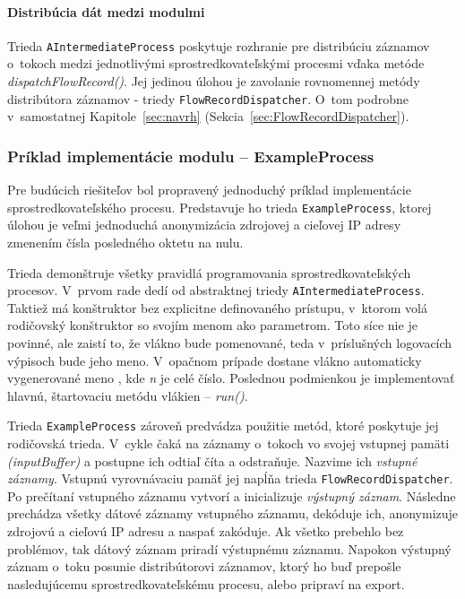 \paragraph{Distribúcia dát medzi modulmi} 
Trieda \verb|AIntermediateProcess| poskytuje rozhranie pre distribúciu záznamov o~tokoch medzi 
jednotlivými sprostredkovateľskými procesmi vďaka metóde \emph{dispatchFlowRecord()}. 
Jej jedinou úlohou je zavolanie rovnomennej metódy distribútora záznamov - triedy \verb|FlowRecordDispatcher|.
O~tom podrobne v~samostatnej Kapitole~\ref{sec:navrh} (Sekcia~\ref{sec:FlowRecordDispatcher}).



\subsubsection{Príklad implementácie modulu -- ExampleProcess}

Pre budúcich riešiteľov bol propravený jednoduchý príklad implementácie sprostredkovateľského procesu.
Predstavuje ho trieda \verb|ExampleProcess|, ktorej úlohou je veľmi jednoduchá anonymizácia zdrojovej a 
cieľovej IP adresy zmenením čísla posledného oktetu na nulu. 

Trieda demonštruje všetky pravidlá programovania sprostredkovateľských procesov. V~prvom rade dedí od 
abstraktnej triedy \verb|AIntermediateProcess|. Taktiež má konštruktor bez explicitne definovaného 
prístupu, v~ktorom volá rodičovský konštruktor so svojím menom ako parametrom. Toto síce nie je povinné,
ale zaistí to, že vlákno bude pomenované, teda v~príslušných logovacích výpisoch bude jeho meno.
V~opačnom prípade dostane vlákno automaticky vygenerované meno , kde \emph{n} je celé 
číslo. Poslednou podmienkou je implementovať hlavnú, štartovaciu metódu vlákien -- \emph{run()}.

Trieda \verb|ExampleProcess| zároveň predvádza použitie metód, ktoré poskytuje jej rodičovská trieda.
V~cykle čaká na záznamy o~tokoch vo svojej vstupnej pamäti \emph{(inputBuffer)} a postupne ich odtiaľ 
číta a odstraňuje. Nazvime ich 
\emph{vstupné záznamy}. Vstupnú vyrovnávaciu pamäť jej napĺňa trieda \verb|FlowRecordDispatcher|. Po 
prečítaní 
vstupného záznamu vytvorí a inicializuje \emph{výstupný záznam}. Následne prechádza všetky dátové záznamy
vstupného záznamu, dekóduje ich, anonymizuje zdrojovú a cieľovú IP adresu a naspať zakóduje. Ak všetko 
prebehlo bez problémov, tak dátový záznam priradí výstupnému záznamu. Napokon výstupný záznam o~toku 
posunie distribútorovi záznamov, ktorý ho buď prepošle 
nasledujúcemu sprostredkovateľskému procesu, alebo pripraví na export.




